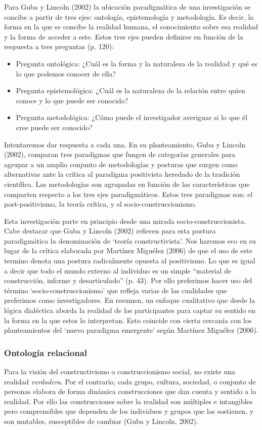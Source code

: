 Para Guba y Lincoln (2002) la ubicación paradigmática de una investigación se
concibe a partir de tres ejes: ontología, epistemología y metodología.
Es decir, la forma en la que se concibe la realidad humana, el conocimiento
sobre esa realidad y la forma de acceder a este.
Estos tres ejes pueden definirse en función de la respuesta a tres preguntas (p.
120):

\begin{itemize}
    \item Pregunta ontológica: ¿Cuál es la forma y la naturaleza de la realidad
    y qué es lo que podemos conocer de ella?
    \item Pregunta epistemológica: ¿Cuál es la naturaleza de la relación entre
    quien conoce y lo que puede ser conocido?
    \item Pregunta metodológica: ¿Cómo puede el investigador averiguar si lo que
    él cree puede ser conocido?
\end{itemize}

Intentaremos dar respuesta a cada una.
En su planteamiento, Guba y Lincoln (2002), comparan tres paradigmas que fungen
de categorías generales para agrupar a un amplio conjunto de metodologías y
posturas que surgen como alternativas ante la crítica al paradigma positivista
heredado de la tradición científica.
Las metodologías son agrupadas en función de las características que comparten
respecto a los tres ejes paradigmáticos.
Estos tres paradigmas son: el post-positivismo, la teoría crítica, y el
socio-construccionismo.

Esta investigación parte en principio desde una mirada socio-construccionista.
Cabe destacar que Guba y Lincoln (2002) refieren para esta postura paradigmática
la denominación de ‘teoría constructivista’.
Nos haremos eco en su lugar de la crítica elaborada por Martínez Miguélez (2006)
de que el uso de este termino denota una postura radicalmente opuesta al
positivismo.
Lo que es igual a decir que todo el mundo externo al individuo es un simple
“material de construcción, informe y desarticulado” (p. 43).
Por ello preferimos hacer uso del término ‘socio-construccionismo’ que refleja
varias de las cualidades que preferimos como investigadores.
En resumen, un enfoque cualitativo que desde la lógica dialéctica aborda la
realidad de los participantes para captar su sentido en la forma en la que estos
lo interpretan.
Esto coincide con cierta cercanía con los planteamientos del ‘nuevo paradigma
emergente’ según Martínez Miguélez (2006).

\subsubsection{Ontología relacional}
Para la visión del constructivismo o construccionismo social, no existe una
realidad \emph{verdadera}.
Por el contrario, cada grupo, cultura, sociedad, o conjunto de personas elabora
de forma dinámica construcciones que dan cuenta y sentido a la realidad.
Por ello las construcciones sobre la realidad son múltiples e intangibles pero
comprensibles que dependen de los individuos y grupos que las sostienen, y son
mutables, susceptibles de cambiar (Guba y Lincoln, 2002).

